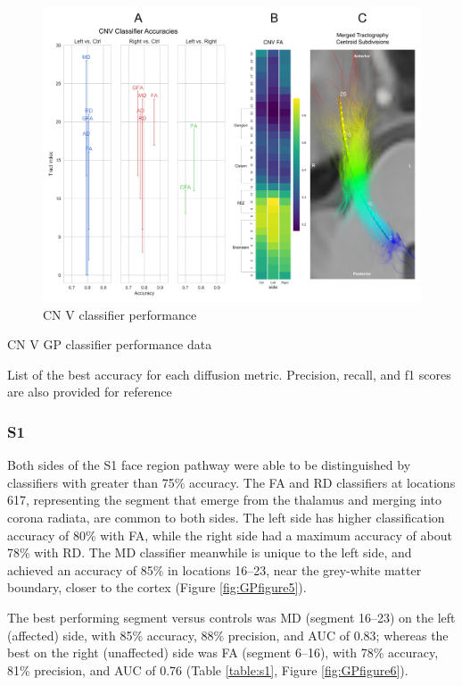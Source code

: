 \begin{figure}[ht]
\centering
\includegraphics[width=\linewidth]{figure-GP-CNV.pdf}
\caption{CN V classifier performance}
\label{fig:GPfigure4}
\end{figure}

\begin{table}[ht]
\centering
{}
\caption{CN V GP classifier performance data}
\caption*{List of the best accuracy for each diffusion metric. Precision, recall, and f1 scores are also provided for reference}
\label{table:CN V}
\end{table}

\subsubsection{S1}
Both sides of the S1 face region pathway were able to be distinguished by classifiers with greater than 75\% accuracy. 
The FA and RD classifiers at locations 617, representing the segment that emerge from the thalamus and merging into corona radiata, are common to both sides. The left side has higher classification accuracy of 80\% with FA, while the right side had a maximum accuracy of about 78\% with RD. 
The MD classifier meanwhile  is unique to the left side, and achieved an accuracy of 85\% in locations 16--23, near the grey-white matter boundary, closer to the cortex (Figure \ref{fig:GPfigure5}).

The best performing segment versus controls was MD (segment 16--23) on the left (affected) side, with 85\% accuracy, 88\% precision, and AUC of 0.83; whereas the best on the right (unaffected) side was FA (segment 6--16), with 78\% accuracy, 81\% precision, and AUC of 0.76 (Table \ref{table:s1}, Figure \ref{fig:GPfigure6}). 

